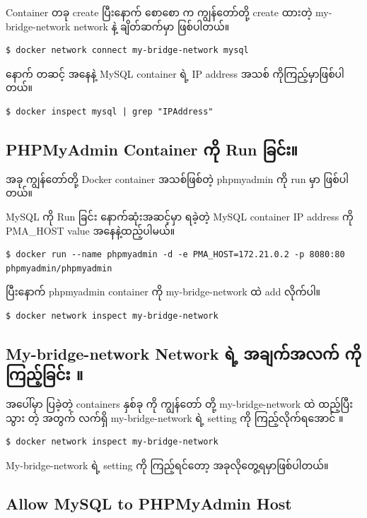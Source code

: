 Container တခု create ပြီးနောက် စောစော က ကျွန်တော်တို့ create ထားတဲ့
my-bridge-network network နဲ့ ချိတ်ဆက်မှာ ဖြစ်ပါတယ်။

\begin{verbatim}
$ docker network connect my-bridge-network mysql
\end{verbatim}

နောက် တဆင့် အနေနဲ့ MySQL container ရဲ့ IP address အသစ်
ကိုကြည့်မှာဖြစ်ပါတယ်။

\begin{verbatim}
$ docker inspect mysql | grep "IPAddress"
\end{verbatim}

\subsection{PHPMyAdmin Container ကို Run
ခြင်း။}\label{phpmyadmin-container--run-}

အခု ကျွန်တော်တို့ Docker container အသစ်ဖြစ်တဲ့ phpmyadmin ကို run မှာ
ဖြစ်ပါတယ်။

MySQL ကို Run ခြင်း နောက်ဆုံးအဆင့်မှာ ရခဲ့တဲ့ MySQL container IP address
ကို PMA\_HOST value အနေနဲ့ထည့်ပါမယ်။

\begin{verbatim}
$ docker run --name phpmyadmin -d -e PMA_HOST=172.21.0.2 -p 8080:80 phpmyadmin/phpmyadmin
\end{verbatim}

ပြီးနောက် phpmyadmin container ကို my-bridge-network ထဲ add လိုက်ပါ။

\begin{verbatim}
$ docker network inspect my-bridge-network
\end{verbatim}

\subsection{My-bridge-network Network ရဲ့ အချက်အလက် ကိုကြည့်ခြင်း
။}\label{my-bridge-network-network---}

အပေါ်မှာ ပြခဲ့တဲ့ containers နှစ်ခု ကို ကျွန်တော် တို့ my-bridge-network
ထဲ ထည့်ပြီးသွား တဲ့ အတွက် လက်ရှိ my-bridge-network ရဲ့ setting ကို
ကြည့်လိုက်ရအောင် ။

\begin{verbatim}
$ docker network inspect my-bridge-network
\end{verbatim}

My-bridge-network ရဲ့ setting ကို ကြည့်ရင်တော့ အခုလိုတွေ့ရမှာဖြစ်ပါတယ်။

\subsection{Allow MySQL to PHPMyAdmin
Host}\label{allow-mysql-to-phpmyadmin-host}

